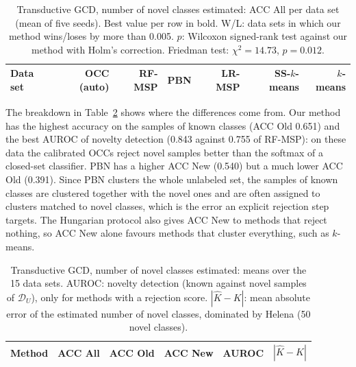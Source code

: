 \documentclass[pdflatex,sn-basic]{sn-jnl}
\newcommand{\DU}{\mathcal{D}_U}
\begin{document}
\begin{table}[t]
\caption{Transductive GCD, number of novel classes estimated: ACC All per data set (mean of five seeds). Best value per row in bold. W/L: data sets in which our method wins/loses by more than 0.005. $p$: Wilcoxon signed-rank test against our method with Holm's correction. Friedman test: $\chi^2 = 14.73$, $p = 0.012$.}\label{tab:c2}
\centering\footnotesize
\begin{tabular}{@{}lrrrrrr@{}}
\toprule
Data set & OCC (auto) & RF-MSP & PBN & LR-MSP & SS-$k$-means & $k$-means \\
\midrule

\end{tabular}
\end{table}

The breakdown in Table~\ref{tab:c2summary} shows where the differences come from. Our method has the highest accuracy on the samples of known classes (ACC Old 0.651) and the best AUROC of novelty detection (0.843 against 0.755 of RF-MSP): on these data the calibrated OCCs reject novel samples better than the softmax of a closed-set classifier. PBN has a higher ACC New (0.540) but a much lower ACC Old (0.391). Since PBN clusters the whole unlabeled set, the samples of known classes are clustered together with the novel ones and are often assigned to clusters matched to novel classes, which is the error an explicit rejection step targets. The Hungarian protocol also gives ACC New to methods that reject nothing, so ACC New alone favours methods that cluster everything, such as $k$-means.

\begin{table}[t]
\caption{Transductive GCD, number of novel classes estimated: means over the 15 data sets. AUROC: novelty detection (known against novel samples of $\DU$), only for methods with a rejection score. $|\hat K - K|$: mean absolute error of the estimated number of novel classes, dominated by Helena (50 novel classes).}\label{tab:c2summary}
\centering\footnotesize
\begin{tabular}{@{}lrrrrr@{}}
\toprule
Method & ACC All & ACC Old & ACC New & AUROC & $|\hat K - K|$ \\
\midrule

\end{tabular}
\end{table}
\end{document}
